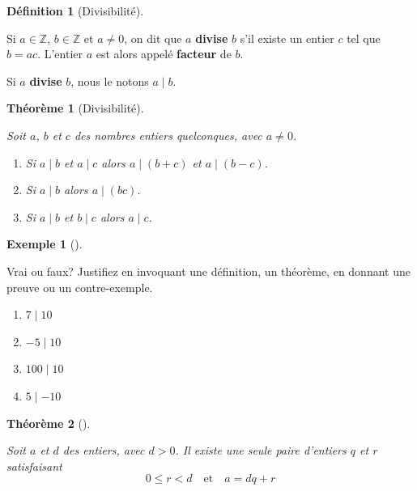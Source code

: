 \documentclass[
  letterpaper,
]{scrbook}
\providecommand{\tightlist}{%
  \setlength{\itemsep}{0pt}\setlength{\parskip}{0pt}}\usepackage{longtable,booktabs,array}
\theoremstyle{plain}
\newtheorem{theorem}{Théorème}[chapter]
\theoremstyle{definition}
\newtheorem{definition}{Définition}[chapter]
\theoremstyle{definition}
\newtheorem{example}{Exemple}[chapter]
\theoremstyle{remark}
\begin{document}
\begin{definition}[Divisibilité]\protect\hypertarget{def-divisibilite}{}\label{def-divisibilite}

Si \(a\in\mathbb{Z}\), \(b\in\mathbb{Z}\) et \(a\neq 0\), on dit que
\(a\) \textbf{divise} \(b\) s'il existe un entier \(c\) tel que
\(b=ac\). L'entier \(a\) est alors appelé \textbf{facteur} de \(b\).

Si \(a\) \textbf{divise} \(b\), nous le notons \(a \mid b\).

\end{definition}

\begin{theorem}[Divisibilité]\protect\hypertarget{thm-divisibilite}{}\label{thm-divisibilite}

Soit \(a\), \(b\) et \(c\) des nombres entiers quelconques, avec
\(a\neq 0\).

\begin{enumerate}
\def\labelenumi{\arabic{enumi}.}
\tightlist
\item
  Si \(a\mid b\) et \(a\mid c\) alors \(a\mid(b+c)\) et \(a\mid (b-c)\).
\item
  Si \(a\mid b\) alors \(a\mid (bc)\).
\item
  Si \(a\mid b\) et \(b\mid c\) alors \(a\mid c\).
\end{enumerate}

\end{theorem}

\begin{example}[]\protect\hypertarget{exm-vrai-faux-divisibilite}{}\label{exm-vrai-faux-divisibilite}

Vrai ou faux? Justifiez en invoquant une définition, un théorème, en
donnant une preuve ou un contre-exemple.

\begin{enumerate}
\def\labelenumi{\alph{enumi})}
\tightlist
\item
  \(7\mid 10\)
\item
  \(-5\mid 10\)
\item
  \(100\mid 10\)
\item
  \(5\mid -10\)
\end{enumerate}

\end{example}

\begin{theorem}[]\protect\hypertarget{thm-une-seule-paire-entiers}{}\label{thm-une-seule-paire-entiers}

Soit \(a\) et \(d\) des entiers, avec \(d>0\). Il existe une seule paire
d'entiers \(q\) et \(r\) satisfaisant \[
0\leq r<d \quad \text{et} \quad a=dq+r
\]

\end{theorem}
\end{document}
